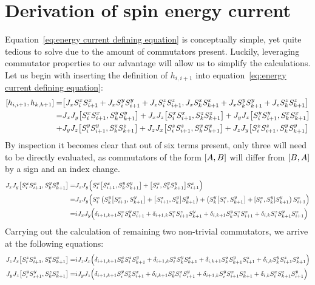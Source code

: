 \chapter{Derivation of spin energy current\label{app:spin energy current derivation}}
\thispagestyle{chapterBeginStyle}

Equation~\eqref{eq:energy current defining equation} is
conceptually simple, yet quite tedious to solve due to the amount of commutators present. Luckily, leveraging commutator properties
to our advantage will allow us to simplify the calculations. Let us begin with inserting the definition of \(h_{i,i+1}\) into 
equation~\eqref{eq:energy current defining equation}:
\begin{align*}
    \comm{h_{i,i+1}}{h_{k,k+1}} =& \comm{J_{x} \Sx_{i}\Sx_{i+1} + J_{x} \Sy_{i}\Sy_{i+1} + J_{z} \Sz_{i}\Sz_{i+1}}{J_{x} \Sx_{k}\Sx_{k+1} + J_{x} \Sy_{k}\Sy_{k+1} + J_{z} \Sz_{k}\Sz_{k+1}}\\
    =& J_{x} J_{y}\comm{\Sx_{i}\Sx_{i+1}}{\Sy_{k}\Sy_{k+1}} + J_{x} J_{z}\comm{\Sx_{i}\Sx_{i+1}}{\Sz_{k}\Sz_{k+1}} + J_{y} J_{x}\comm{\Sy_{i}\Sy_{i+1}}{\Sx_{k}\Sx_{k+1}}\\
    +& J_{y} J_{z}\comm{\Sy_{i}\Sy_{i+1}}{\Sz_{k}\Sz_{k+1}} + J_{z} J_{x}\comm{\Sz_{i}\Sz_{i+1}}{\Sx_{k}\Sx_{k+1}} + J_{z} J_{y}\comm{\Sz_{i}\Sz_{i+1}}{\Sy_{k}\Sy_{k+1}}  
\end{align*}
By inspection it becomes clear that out of six terms present, only three will need to be directly evaluated, as commutators of the form
\(\comm{A}{B}\) will differ from \(\comm{B}{A}\) by a sign and an index change.
\begin{align*}
    J_{x} J_{y}\comm{\Sx_{i}\Sx_{i+1}}{\Sy_{k}\Sy_{k+1}} =& J_x J_y \Big(\Sx_i\comm{\Sx_{i+1}}{\Sy_{k}\Sy_{k+1}} + \comm{\Sx_{i}}{\Sy_{k}\Sy_{k+1}} \Sx_{i+1} \Big)\\
    =& J_x J_y \Big( \Sx_i \left( \Sy_k \comm{\Sx_{i+1}}{\Sy_{k+1}} + \comm{\Sx_{i+1}}{\Sy_{k}} \Sy_{k+1}\right) + 
    \left( \Sy_k \comm{\Sx_{i}}{\Sy_{k+1}} + \comm{\Sx_{i}}{\Sy_{k}} \Sy_{k+1} \right)\Sx_{i+1} \Big)\\
    =& i J_x J_y \Big( \delta_{i+1,k+1} \Sx_i \Sy_k \Sz_{i+1} + \delta_{i+1,k} \Sx_i \Sz_{i+1} \Sy_{k+1} + \delta_{i,k+1} \Sy_k \Sz_i \Sx_{i+1} +\delta_{i,k} \Sz_i \Sy_{k+1} \Sx_{i+1}\Big)
\end{align*}
Carrying out the calculation of remaining two non-trivial commutators, we arrive at the following equations:
\begin{align*}
    J_{z} J_{x}\comm{\Sz_{i}\Sz_{i+1}}{\Sx_{k}\Sx_{k+1}} =& i J_z J_x \Big( \delta_{i+1,k+1} \Sx_k \Sz_i \Sy_{k+1} + \delta_{i+1,k} \Sz_i \Sy_{k} \Sx_{k+1} + \delta_{i,k+1} \Sx_k \Sy_{k+1} \Sz_{i+1} +\delta_{i,k} \Sy_k \Sz_{i+1} \Sx_{k+1}\Big)\\ 
    J_{y} J_{z}\comm{\Sy_{i}\Sy_{i+1}}{\Sz_{k}\Sz_{k+1}} =& i J_y J_z \Big( \delta_{i+1,k+1} \Sy_i \Sz_k \Sx_{i+1} + \delta_{i,k+1} \Sz_k \Sx_{i} \Sy_{i+1} + \delta_{i+1,k} \Sy_i \Sx_{i+1} \Sz_{k+1} +\delta_{i,k} \Sx_i \Sz_{k+1} \Sy_{i+1}\Big) 
\end{align*}
